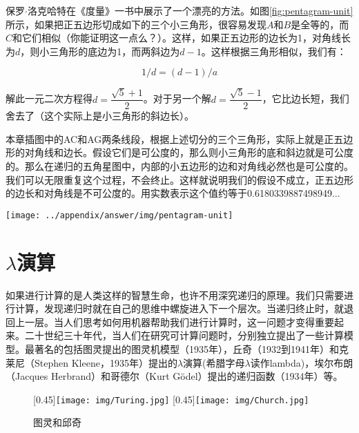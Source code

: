 \documentclass[b5paper]{ctexart}
\begin{document}
\begin{Answer}[ref={ex:euclid-algorithm}]
{保罗$\cdot$洛克哈特在《度量》一书中\cite{Lockhart2012}展示了一个漂亮的方法。如图\ref{fig:pentagram-unit}所示，如果把正五边形切成如下的三个小三角形，很容易发现$A$和$B$是全等的，而$C$和它们相似（你能证明这一点么？）。这样，如果正五边形的边长为1，对角线长为$d$，则小三角形的底边为1，而两斜边为$d - 1$。这样根据三角形相似，我们有：

\[
  1 / d = (d - 1) / a
\]

解此一元二次方程得$d = \dfrac{\sqrt{5} + 1}{2}$。对于另一个解$d = \dfrac{\sqrt{5} - 1}{2}$，它比边长短，我们舍去了（这个实际上是小三角形的斜边长）。

本章插图中的AC和AG两条线段，根据上述切分的三个三角形，实际上就是正五边形的对角线和边长。假设它们是可公度的，那么则小三角形的底和斜边就是可公度的。那么在递归的五角星图中，内部的小五边形的边和对角线必然也是可公度的。我们可以无限重复这个过程，不会终止。这样就说明我们的假设不成立，正五边形的边长和对角线是不可公度的。用实数表示这个值约等于0.6180339887498949...

\begin{center}
 \texttt{[image: ../appendix/answer/img/pentagram-unit]}
 \label{fig:pentagram-unit}
\end{center}
}
\end{Answer}

\section{\texorpdfstring{$\lambda$}{λ}演算}

如果进行计算的是人类这样的智慧生命，也许不用深究递归的原理。我们只需要进行计算，发现递归时就在自己的思维中螺旋进入下一个层次。当递归终止时，就退回上一层。当人们思考如何用机器帮助我们进行计算时，这一问题才变得重要起来。二十世纪三十年代，当人们在研究可计算问题时，分别独立提出了一些计算模型。最著名的包括图灵提出的图灵机模型（1935年），丘奇（1932到1941年）和克莱尼（Stephen Kleene，1935年）提出的$\lambda$演算(希腊字母$\lambda$读作lambda)，埃尔布朗（Jacques Herbrand）和哥德尔（Kurt Gödel）提出的递归函数（1934年）等。

\begin{figure}[htbp]
 \centering
 [0.45\linewidth]{\texttt{[image: img/Turing.jpg]}} \quad
 [0.45\linewidth]{\texttt{[image: img/Church.jpg]}}
 \caption{图灵和邱奇}
 \label{fig:Turing}
 \label{fig:Church}
\end{figure}
\end{document}
